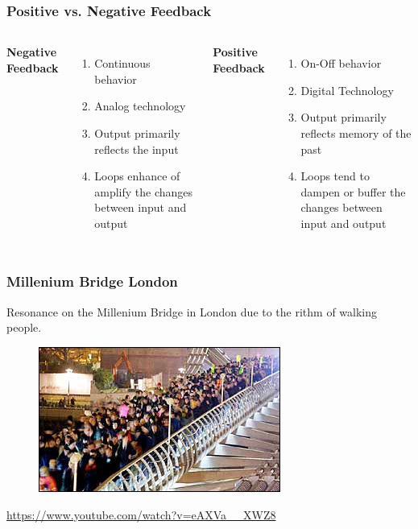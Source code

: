 \documentclass{beamer}
\begin{document}
\begin{frame}
\frametitle{Positive vs. Negative Feedback}
\begin{columns}[c]

\centering \textbf{Negative Feedback}
\begin{enumerate}
\item Continuous behavior
\item Analog technology
\item Output primarily reflects the input
\item Loops enhance of amplify the changes between input and output
\end{enumerate}

\centering \textbf{Positive Feedback}
\begin{enumerate}
\item On-Off behavior
\item Digital Technology
\item Output primarily reflects memory of the past
\item Loops tend to dampen or buffer the changes between input and output
\end{enumerate}

\end{columns}
\end{frame}


\begin{frame}
\frametitle{Millenium Bridge London}
Resonance on the Millenium Bridge in London due to the rithm of walking people.
\begin{figure}
\includegraphics[scale=0.9]{Millenium_bridge}
\end{figure}
\url{https://www.youtube.com/watch?v=eAXVa__XWZ8}
\end{frame}

\end{document}
